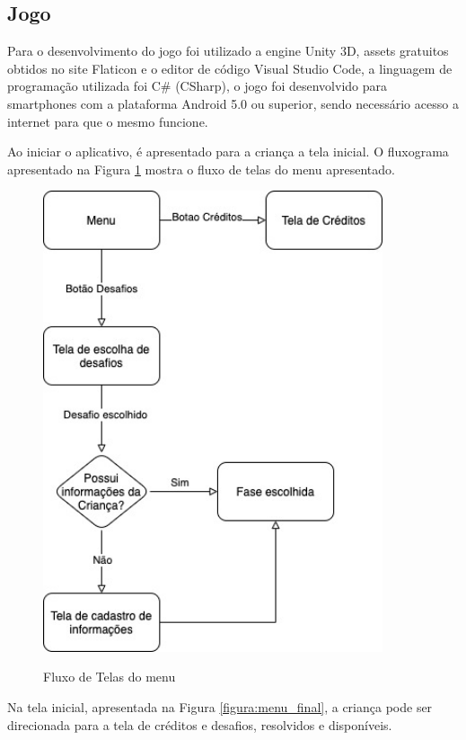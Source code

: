     \subsection{Jogo}
    
    Para o desenvolvimento do jogo foi utilizado a engine Unity 3D, assets gratuitos obtidos no site Flaticon e o editor de código Visual Studio Code, a linguagem de programação utilizada foi C\# (CSharp), o jogo foi desenvolvido para smartphones com a plataforma Android 5.0 ou superior, sendo necessário acesso a internet para que o mesmo funcione.
    
    Ao iniciar o aplicativo, é apresentado para a criança a tela inicial. O fluxograma apresentado na Figura \ref{figura:fluxo_telas} mostra o fluxo de telas do menu apresentado.
    
    \begin{figure}[H]
        \caption{Fluxo de Telas do menu}
        \centering
        \includegraphics[width=10cm]{Imagens/Cap4/fluxo_menu.jpg}
        \label{figura:fluxo_telas}
    \end{figure}
    
    Na tela inicial, apresentada na Figura \ref{figura:menu_final}, a criança pode ser direcionada para a tela de créditos e desafios, resolvidos e disponíveis. 
    
